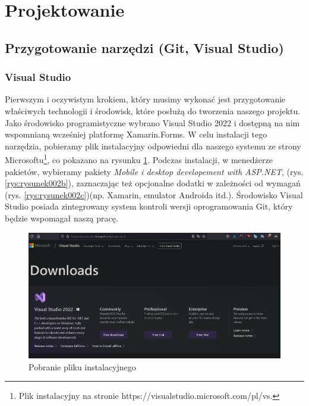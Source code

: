 	\newpage
\section{Projektowanie}		%

\subsection{Przygotowanie narzędzi (Git, Visual Studio)}		%

\subsubsection{Visual Studio} %
\hspace{0.60cm}Pierwszym i oczywistym krokiem, który musimy wykonać jest przygotowanie właściwych technologii i środowisk, które posłużą do tworzenia naszego projektu. Jako środowisko programistyczne wybrano Visual Studio 2022 i dostępną na nim wspomnianą wcześniej platformę Xamarin.Forms. W celu instalacji tego narzędzia, pobieramy plik instalacyjny odpowiedni dla naszego systemu ze strony Microsoftu\footnote{Plik instalacyjny na stronie  https://visualstudio.microsoft.com/pl/vs\cite{www3}.}, co pokazano na rysunku \ref{rys:rysunek002a}. Podczas instalacji, w menedżerze pakietów, wybieramy pakiety \textit{Mobile i desktop developement with ASP.NET}, (rys. \ref{rys:rysunek002b}), zaznaczając też opcjonalne dodatki w zależności od wymagań (rys. \ref{rys:rysunek002c})(np. Xamarin, emulator Androida itd.). Środowisko Visual Studio posiada zintegrowany system kontroli wersji oprogramowania Git, który będzie wspomagał naszą pracę.

\begin{figure}[!htb]
	\centering
	\includegraphics[width=0.8\linewidth]{rys/vs1.png}
	\caption{Pobranie pliku instalacyjnego}
	\label{rys:rysunek002a}
\end{figure}

